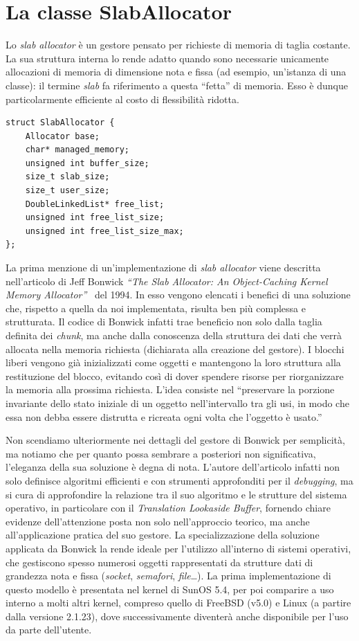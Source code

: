 
\section{La classe SlabAllocator}
Lo \textit{slab allocator} è un gestore pensato per richieste di memoria di taglia costante. La sua struttura interna lo rende adatto quando sono necessarie unicamente allocazioni di memoria di dimensione nota e fissa (ad esempio, un'istanza di una classe): il termine \textit{slab} fa riferimento a questa “fetta” di memoria. Esso è dunque particolarmente efficiente al costo di flessibilità ridotta.

\begin{lstlisting}
struct SlabAllocator {
    Allocator base;
    char* managed_memory;
    unsigned int buffer_size;
    size_t slab_size;   
    size_t user_size;
    DoubleLinkedList* free_list;   
    unsigned int free_list_size;
    unsigned int free_list_size_max;
};
\end{lstlisting}

La prima menzione di un’implementazione di \textit{slab allocator} viene descritta nell’articolo di Jeff Bonwick \textit{“The Slab Allocator: An Object-Caching Kernel Memory Allocator”}~\cite{slab} del 1994. In esso vengono elencati i benefici di una soluzione che, rispetto a quella da noi implementata, risulta ben più complessa e strutturata. Il codice di Bonwick infatti trae beneficio non solo dalla taglia definita dei \textit{chunk}, ma anche dalla conoscenza della struttura dei dati che verrà allocata nella memoria richiesta (dichiarata alla creazione del gestore). I blocchi liberi vengono già inizializzati come oggetti e mantengono la loro struttura alla restituzione del blocco, evitando così di dover spendere risorse per riorganizzare la memoria alla prossima richiesta. L’idea consiste nel “preservare la porzione invariante dello stato iniziale di un oggetto nell’intervallo tra gli usi, in modo che essa non debba essere distrutta e ricreata ogni volta che l’oggetto è usato.”

Non scendiamo ulteriormente nei dettagli del gestore di Bonwick per semplicità, ma notiamo che per quanto possa sembrare a posteriori non significativa, l’eleganza della sua soluzione è degna di nota. L’autore dell’articolo infatti non solo definisce algoritmi efficienti e con strumenti approfonditi per il \textit{debugging}, ma si cura di approfondire la relazione tra il suo algoritmo e le strutture del sistema operativo, in particolare con il \textit{Translation Lookaside Buffer}, fornendo chiare evidenze dell’attenzione posta non solo nell’approccio teorico, ma anche all’applicazione pratica del suo gestore. La specializzazione della soluzione applicata da Bonwick la rende ideale per l’utilizzo all’interno di sistemi operativi, che gestiscono spesso numerosi oggetti rappresentati da strutture dati di grandezza nota e fissa (\textit{socket}, \textit{semafori}, \textit{file}…). La prima implementazione di questo modello è presentata nel kernel di SunOS 5.4, per poi comparire a uso interno a molti altri kernel, compreso quello di FreeBSD (v5.0) e Linux (a partire dalla versione 2.1.23), dove successivamente diventerà anche disponibile per l’uso da parte dell’utente.

